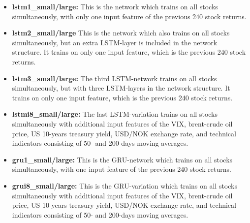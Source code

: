 \indent \newline
\begin{itemize} 
\item {\textbf{lstm1\_small/large:} This is the network which trains on all stocks simultaneously, with only one input feature of the previous 240 stock returns.}  
\item {\textbf{lstm2\_small/large} This is the network which also trains on all stocks simultaneously, but an extra LSTM-layer is included in the network structure. It trains on only one input feature, which is the previous 240 stock returns.}
\item {\textbf{lstm3\_small/large:} The third LSTM-network trains on all stocks simultaneously, but with three LSTM-layers in the network structure. It trains on only one input feature, which is the previous 240 stock returns.}
\item {\textbf{lstmi8\_small/large:} The last LSTM-variation trains on all stocks simultaneously with additional input features of the VIX, brent-crude oil price, US 10-years treasury yield, USD/NOK exchange rate, and technical indicators consisting of 50- and 200-days moving averages.}
\item {\textbf{gru1\_small/large:} This is the GRU-network which trains on all stocks simultaneously, with one input feature of the previous 240 stock returns.}
\item {\textbf{grui8\_small/large:} This is the GRU-variation which trains on all stocks simultaneously with additional input features of the VIX, brent-crude oil price, US 10-years treasury yield, USD/NOK exchange rate, and technical indicators consisting of 50- and 200-days moving averages.}
\end{itemize}   

